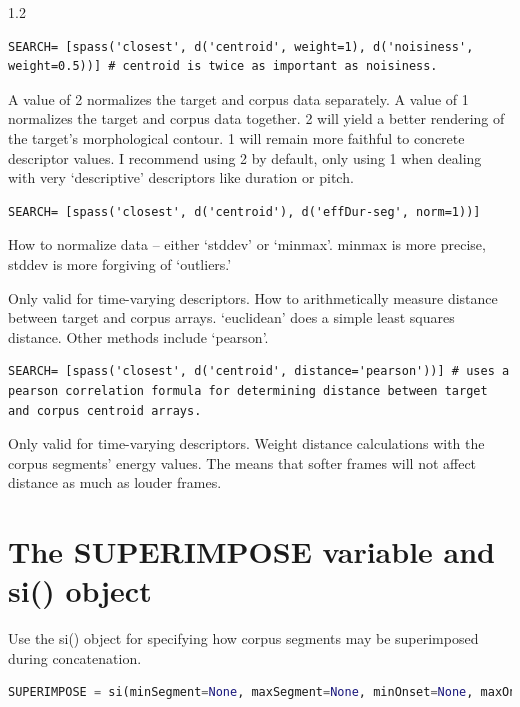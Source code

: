 \documentclass{article}
\begin{document}
\begin{spacing}{1.2}
\begin{description}
\begin{lstlisting}
SEARCH= [spass('closest', d('centroid', weight=1), d('noisiness', weight=0.5))] # centroid is twice as important as noisiness.
\end{lstlisting}

\item[norm*] A value of 2 normalizes the target and corpus data separately.  A value of 1 normalizes the target and corpus data together.  2 will yield a better rendering of the target's morphological contour.  1 will remain more faithful to concrete descriptor values.  I recommend using 2 by default, only using 1 when dealing with very `descriptive' descriptors like duration or pitch.

\begin{lstlisting}
SEARCH= [spass('closest', d('centroid'), d('effDur-seg', norm=1))]
\end{lstlisting}

\item[normmethod*] How to normalize data -- either `stddev' or `minmax'.  minmax is more precise, stddev is more forgiving of `outliers.'

\item[distance*] Only valid for time-varying descriptors.  How to arithmetically measure distance between target and corpus arrays.  `euclidean' does a simple least squares distance.  Other methods include `pearson'.

\begin{lstlisting}
SEARCH= [spass('closest', d('centroid', distance='pearson'))] # uses a pearson correlation formula for determining distance between target and corpus centroid arrays.
\end{lstlisting}

\item[energyWeight] Only valid for time-varying descriptors.  Weight distance calculations with the corpus segments' energy values.  The means that softer frames will not affect distance as much as louder frames.
\end{description}


\section{The SUPERIMPOSE variable and si() object}
Use the si() object for specifying how corpus segments may be superimposed during concatenation.

 \begin{lstlisting}[language=python]
SUPERIMPOSE = si(minSegment=None, maxSegment=None, minOnset=None, maxOnset=8, minOverlap=None, maxOverlap=None, searchOrder='power', calcMethod='mixture', peakAlign=False)
\end{lstlisting}
 

\end{spacing}
\end{document}
